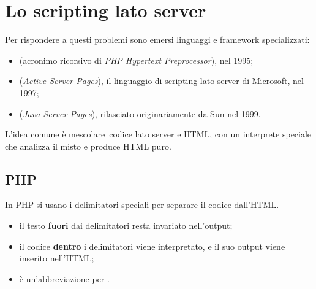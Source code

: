 
\section{Lo scripting lato server}

Per rispondere a questi problemi sono emersi linguaggi e framework
specializzati:

\begin{itemize}
  \item {} (acronimo ricorsivo di \textit{PHP Hypertext
        Preprocessor}), nel 1995;
  \item {} (\textit{Active Server Pages}), il linguaggio di scripting
        lato server di Microsoft, nel 1997;
  \item {} (\textit{Java Server Pages}), rilasciato originariamente da
        Sun nel 1999.
\end{itemize}

L'idea comune è \guillemotleft mescolare\guillemotright\ codice lato server e HTML, con un
interprete speciale che analizza il misto e produce HTML \guillemotleft puro\guillemotright.

\subsection{PHP}

In PHP si usano i delimitatori speciali  per separare il
codice dall'HTML.

\begin{itemize}
  \item il testo \textbf{fuori} dai delimitatori resta invariato nell'output;
  \item il codice \textbf{dentro} i delimitatori viene interpretato, e il suo
        output viene inserito nell'HTML;
  \item {} è un'abbreviazione per .
\end{itemize}

